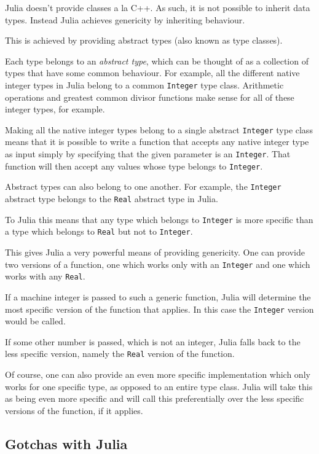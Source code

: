 \documentclass[a4paper,10pt]{article}
\newcommand{\code}{\lstinline}
\begin{document}
Julia doesn't provide classes a la C++. As such, it is not possible to inherit data types. Instead
Julia achieves genericity by inheriting behaviour.

This is achieved by providing abstract types (also known as type classes).

Each type belongs to an \emph{abstract type}, which can be thought of as a collection of types that
have some common behaviour. For example, all the different native integer types in Julia belong to a
common \code{Integer} type class. Arithmetic operations and greatest common divisor functions
make sense for all of these integer types, for example.

Making all the native integer types belong to a single abstract \code{Integer} type class means that it
is possible to write a function that accepts any native integer type as input simply by specifying that
the given parameter is an \code{Integer}. That function will then accept any values whose type belongs
to \code{Integer}.

Abstract types can also belong to one another. For example, the \code{Integer} abstract type belongs to
the \code{Real} abstract type in Julia. 

To Julia this means that any type which belongs to \code{Integer} is more specific than a type which
belongs to \code{Real} but not to \code{Integer}.

This gives Julia a very powerful means of providing genericity. One can provide two versions of a
function, one which works only with an \code{Integer} and one which works with any \code{Real}.

If a machine integer is passed to such a generic function, Julia will determine the most specific
version of the function that applies. In this case the \code{Integer} version would be called.

If some other number is passed, which is not an integer, Julia falls back to the less specific version,
namely the \code{Real} version of the function.

Of course, one can also provide an even more specific implementation which only works for one specific
type, as opposed to an entire type class. Julia will take this as being even more specific and will call
this preferentially over the less specific versions of the function, if it applies.

\subsection{Gotchas with Julia}
\end{document}
